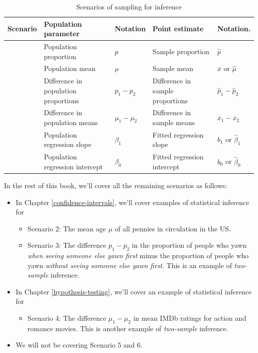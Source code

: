 \documentclass[
]{book}
\providecommand{\tightlist}{%
  \setlength{\itemsep}{0pt}\setlength{\parskip}{0pt}}
\begin{document}
\begin{table}[!h]

\caption{\label{tab:table-ch8}\label{tab:summarytable-ch8}Scenarios of sampling for inference}
\centering
\fontsize{10}{12}\selectfont
\begin{tabular}[t]{>{\raggedleft\arraybackslash}p{0.5in}>{\raggedright\arraybackslash}p{0.7in}>{\raggedright\arraybackslash}p{1in}>{\raggedright\arraybackslash}p{1.1in}>{\raggedright\arraybackslash}p{1in}}
\toprule
Scenario & Population parameter & Notation & Point estimate & Notation.\\
\midrule
1 & Population proportion & $p$ & Sample proportion & $\widehat{p}$\\
2 & Population mean & $\mu$ & Sample mean & $\overline{x}$ or $\widehat{\mu}$\\
3 & Difference in population proportions & $p_1 - p_2$ & Difference in sample proportions & $\widehat{p}_1 - \widehat{p}_2$\\
4 & Difference in population means & $\mu_1 - \mu_2$ & Difference in sample means & $\overline{x}_1 - \overline{x}_2$\\
5 & Population regression slope & $\beta_1$ & Fitted regression slope & $b_1$ or $\widehat{\beta}_1$\\
\addlinespace
6 & Population regression intercept & $\beta_0$ & Fitted regression intercept & $b_0$ or $\widehat{\beta}_0$\\
\bottomrule
\end{tabular}
\end{table}

In the rest of this book, we'll cover all the remaining scenarios as follows:

\begin{itemize}
\tightlist
\item
  In Chapter \ref{confidence-intervals}, we'll cover examples of statistical inference for

  \begin{itemize}
  \tightlist
  \item
    Scenario 2: The mean age \(\mu\) of all pennies in circulation in the US.
  \item
    Scenario 3: The difference \(p_1 - p_2\) in the proportion of people who yawn \emph{when seeing someone else yawn first} minus the proportion of people who yawn \emph{without seeing someone else yawn first}. This is an example of \emph{two-sample} inference.
  \end{itemize}
\item
  In Chapter \ref{hypothesis-testing}, we'll cover an example of statistical inference for

  \begin{itemize}
  \tightlist
  \item
    Scenario 4: The difference \(\mu_1 - \mu_2\) in mean IMDb ratings for action and romance movies. This is another example of \emph{two-sample} inference.
  \end{itemize}
\item
  We will not be covering Scenario 5 and 6.
\end{itemize}
\end{document}
